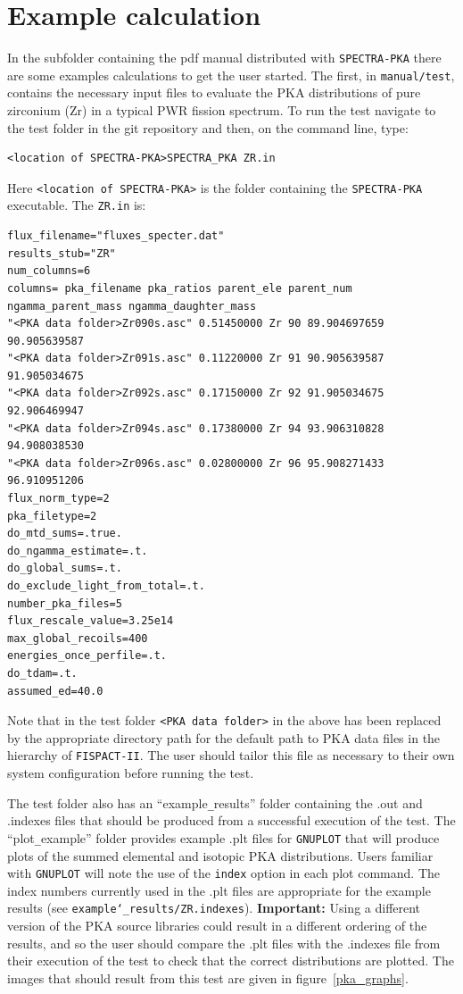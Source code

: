 \documentclass[a4paper]{article}
\begin{document}
\section{Example calculation}
In the subfolder containing the pdf manual distributed with \texttt{SPECTRA-PKA} there are some examples calculations to get the user started. The first, in \texttt{manual/test}, contains the necessary input files to evaluate the PKA distributions of pure zirconium (Zr) in a typical PWR fission spectrum. To run the test navigate to the test folder in the git repository and then, on the command line, type:
\begin{verbatim}
<location of SPECTRA-PKA>SPECTRA_PKA ZR.in
\end{verbatim}
Here \texttt{<location of SPECTRA-PKA>} is the folder containing the \texttt{SPECTRA-PKA} executable. The \texttt{ZR.in} is:
{\footnotesize
\begin{verbatim}
flux_filename="fluxes_specter.dat"
results_stub="ZR"
num_columns=6
columns= pka_filename pka_ratios parent_ele parent_num ngamma_parent_mass ngamma_daughter_mass
"<PKA data folder>Zr090s.asc" 0.51450000 Zr 90 89.904697659 90.905639587
"<PKA data folder>Zr091s.asc" 0.11220000 Zr 91 90.905639587 91.905034675
"<PKA data folder>Zr092s.asc" 0.17150000 Zr 92 91.905034675 92.906469947
"<PKA data folder>Zr094s.asc" 0.17380000 Zr 94 93.906310828 94.908038530
"<PKA data folder>Zr096s.asc" 0.02800000 Zr 96 95.908271433 96.910951206
flux_norm_type=2
pka_filetype=2
do_mtd_sums=.true.
do_ngamma_estimate=.t.
do_global_sums=.t.
do_exclude_light_from_total=.t.
number_pka_files=5
flux_rescale_value=3.25e14
max_global_recoils=400
energies_once_perfile=.t.
do_tdam=.t.
assumed_ed=40.0
\end{verbatim}}
Note that in the test folder \texttt{<PKA data folder>} in the above has been replaced by the appropriate directory path for the default path to PKA data files in the hierarchy of \texttt{FISPACT-II}. The user should tailor this file as necessary to their own system configuration before running the test.

The test folder also has an ``example\verb|_|results'' folder containing the .out and .indexes files that should be produced from a successful execution of the test. The ``plot\verb|_|example'' folder provides example .plt files for \texttt{GNUPLOT} that will produce plots of the summed elemental and isotopic PKA distributions. Users familiar with \texttt{GNUPLOT} will note the use of the \texttt{index} option in each plot command. The index numbers currently used in the .plt files are appropriate for the example results (see \texttt{example\char`_results/ZR.indexes}). \textbf{Important:} Using a different version of the PKA source libraries could result in a different ordering of the results, and so the user should compare the .plt files with the .indexes file from their execution of the test to check that the correct distributions are plotted. The images that should result from this test are given in figure~\ref{pka_graphs}.
\end{document}

